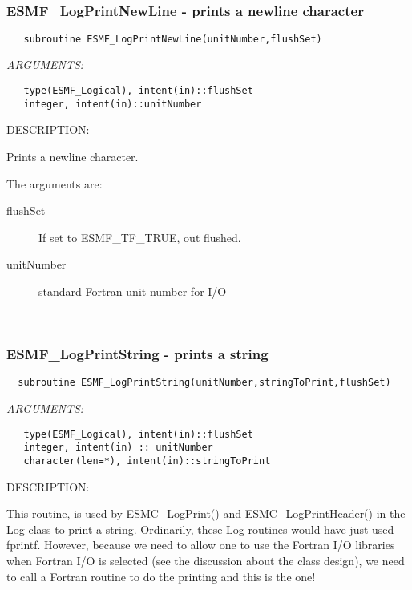 \mbox{}\hrulefill\ 
 
\subsubsection [ESMF\_LogPrintNewLine] {ESMF\_LogPrintNewLine - prints a newline character}


  
\begin{verbatim}   subroutine ESMF_LogPrintNewLine(unitNumber,flushSet)\end{verbatim}{\em ARGUMENTS:}
\begin{verbatim}   type(ESMF_Logical), intent(in)::flushSet
   integer, intent(in)::unitNumber
 \end{verbatim}
{\sf DESCRIPTION:\\ }


   Prints a newline character. 
  
   The arguments are:
   \begin{description}
  
   \item[flushSet]
   If set to ESMF\_TF\_TRUE, out flushed.
  
   \item[unitNumber]
   standard Fortran unit number for I/O
  
   \end{description} 
 
\mbox{}\hrulefill\ 
 
\subsubsection [ESMF\_LogPrintString] {ESMF\_LogPrintString - prints a string}


  
\begin{verbatim}  subroutine ESMF_LogPrintString(unitNumber,stringToPrint,flushSet)
 \end{verbatim}{\em ARGUMENTS:}
\begin{verbatim}   type(ESMF_Logical), intent(in)::flushSet
   integer, intent(in) :: unitNumber
   character(len=*), intent(in)::stringToPrint
 \end{verbatim}
{\sf DESCRIPTION:\\ }


   This routine, is used by ESMC\_LogPrint() and
   ESMC\_LogPrintHeader() in the Log class to print a string.
   Ordinarily, these Log routines would
   have just used fprintf.  However, because we need to allow one
   to use the Fortran I/O 
   libraries when Fortran I/O is selected
   (see the discussion about the class design), we need to call a
   Fortran routine to do the printing
   and this is the one!
    
